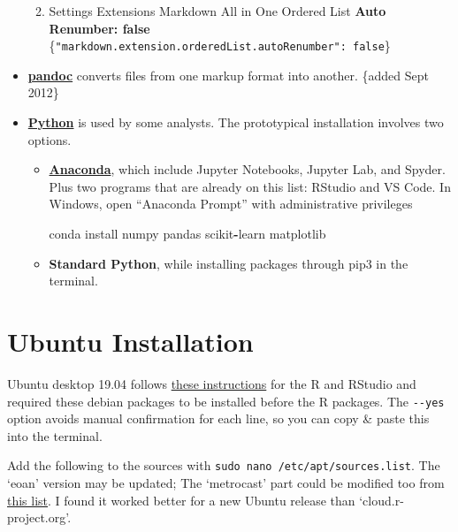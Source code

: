 \documentclass[
]{book}
\newenvironment{Shaded}{\begin{snugshade}}{\end{snugshade}}
\newcommand{\NormalTok}[1]{#1}
\newcommand{\OperatorTok}[1]{\textcolor[rgb]{0.81,0.36,0.00}{\textbf{#1}}}
\providecommand{\tightlist}{%
  \setlength{\itemsep}{0pt}\setlength{\parskip}{0pt}}
\begin{document}
\begin{itemize}
  \begin{enumerate}
  \def\labelenumi{\arabic{enumi}.}
  \tightlist
  \item
    Settings \textbar{} Extensions \textbar Markdown All in One \textbar{} Ordered List \textbar{} \textbf{Auto Renumber: false} \{\texttt{"markdown.extension.orderedList.autoRenumber":\ false}\}
  \end{enumerate}
\item
  \textbf{\href{https://pandoc.org/}{pandoc}} converts files from one markup format into another. \{added Sept 2012\}
\item
  \textbf{\href{https://www.python.org/}{Python}} is used by some analysts. The prototypical installation involves two options.

  \begin{itemize}
  \item
    \textbf{\href{https://www.anaconda.com/distribution/\#download-section}{Anaconda}}, which include Jupyter Notebooks, Jupyter Lab, and Spyder. Plus two programs that are already on this list: RStudio and VS Code. In Windows, open ``Anaconda Prompt'' with administrative privileges

\begin{Shaded}
\begin{Highlighting}[]
\NormalTok{conda install numpy pandas scikit}\OperatorTok{{-}}\NormalTok{learn matplotlib}
\end{Highlighting}
\end{Shaded}
  \item
    \textbf{Standard Python}, while installing packages through pip3 in the terminal.
  \end{itemize}
\end{itemize}

\hypertarget{installation-ubuntu}{%
\section{Ubuntu Installation}\label{installation-ubuntu}}

Ubuntu desktop 19.04 follows \href{https://askubuntu.com/a/862520/153921}{these instructions} for the R and RStudio and required these debian packages to be installed before the R packages. The \texttt{-\/-yes} option avoids manual confirmation for each line, so you can copy \& paste this into the terminal.

Add the following to the sources with \texttt{sudo\ nano\ /etc/apt/sources.list}. The `eoan' version may be updated; The `metrocast' part could be modified too from \href{https://launchpad.net/ubuntu/+archivemirrors}{this list}. I found it worked better for a new Ubuntu release than `cloud.r-project.org'.
\end{document}
